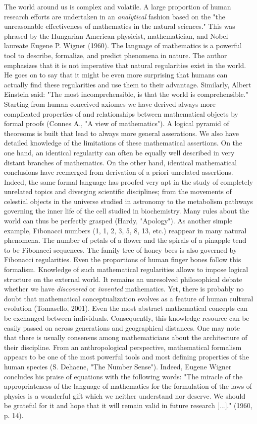 \documentclass[authoryear,review,3p]{elsarticle}
\begin{document}
The world around us is complex and volatile.
%
A large proportion of human research efforts are undertaken
in an \textit{analytical} fashion
based on the 
"the unreasonable effectiveness of mathematics in the natural sciences."
This was phrased by the Hungarian-American
physicist, mathematician, and Nobel laureate Eugene P. Wigner (1960).
The language of mathematics is a powerful tool to
describe, formalize, and predict phenomena in nature.
The author emphasizes that it is not imperative that
natural regularities exist in the world. He goes on to
say that it might be even more surprising that humans can actually
find these regularities and use them to their advantage.
Similarly, Albert Einstein said:
"The most incomprehensible, is that the world is comprehensible." 
%
Starting from human-conceived axiomes
we have derived always more complicated
properties of and relationships between mathematical objects by formal proofs
(Connes A., "A view of mathematics").
A logical pyramid of theoreoms is built that lead to always
more general asserations.
We also have detailed knowledge of the limitations of these mathematical
assertions.
%
On the one hand,
an identical regularity can often be equally well described in very distant
branches of mathematics.
On the other hand,
identical mathematical conclusions have reemerged from derivation of
a priori unrelated assertions.
%
Indeed, the same formal language has proofed very apt in
the study of completely unrelated topics and diverging scientific disciplines;
from the movements of celestial objects in the universe
studied in astronomy
to
the metabolism pathways governing the inner life of the cell
studied in biochemistry.
%
Many rules about the world can thus be perfectly grasped
(Hardy, "Apology").
As another simple example,
Fibonacci numbers (1, 1, 2, 3, 5, 8, 13, etc.)
reappear in many natural phenomena.
The number of petals of a flower and the spirals of a pinapple tend
to be Fibonacci sequences.
The family tree of honey bees is also governed by Fibonacci regularities.
Even the proportions of human finger bones follow this formalism.
Knowledge of such mathematical regularities
allows to impose logical structure on the external world.
%
It remains an unresolved philosophical debate whether we have
\textit{discovered} or \textit{invented} mathematics.
Yet, there is probably no doubt
that mathematical conceptualization
evolves as a feature of human cultural evolution (Tomasello, 2001).
Even the most abstract mathematical concepts can
be exchanged between individuals. Consequently,
this knowledge resource can be easily passed
on across generations and geographical distances.
One may note that
there is usually consensus among mathematicians
about the architecture of their discipline.
From an anthropological perspective,
mathematical formalism
appears to be one of the most
powerful tools and most defining properties of the human species
(S. Dehaene, "The Number Sense").
Indeed,
Eugene Wigner concludes his praise of equations with the following words:
"The miracle of the appropriateness of the language of mathematics
for the formulation of the laws of physics is a wonderful gift
which we neither understand nor deserve. We should be grateful for
it and hope that it will remain valid in future research [...]."
(1960, p. 14).
\end{document}
